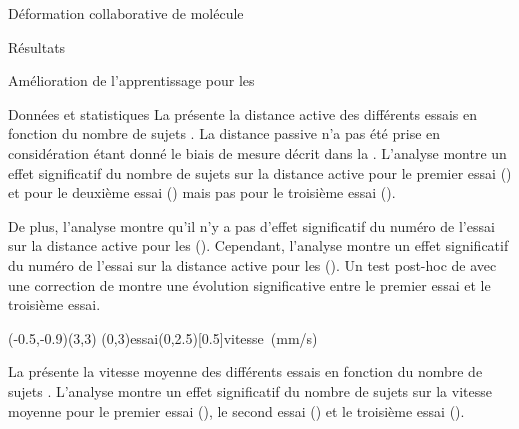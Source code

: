 \documentclass[myfrancais,ngerman,english,frenchb]{mythesis}
\begin{document}
\begin{mychapter}{Déformation collaborative de molécule}
\begin{mysection}{Résultats}
\begin{mysubsection}{Amélioration de l'apprentissage pour les }
\begin{mysubsubsection}{Données et statistiques}
					La  présente la distance active  des différents essais  en fonction du nombre de sujets .
					La distance passive n'a pas été prise en considération étant donné le biais de mesure décrit dans la .
					L'analyse montre un effet significatif du nombre de sujets  sur la distance active  pour le premier essai () et pour le deuxième essai () mais pas pour le troisième essai ().

					De plus, l'analyse montre qu'il n'y a pas d'effet significatif du numéro de l'essai  sur la distance active  pour les  ().
					Cependant, l'analyse montre un effet significatif du numéro de l'essai  sur la distance active  pour les  ().
					Un test post-hoc de  avec une correction de  montre une évolution significative entre le premier essai et le troisième essai.

					\begin{myfigure}
						\begin{myps}(-0.5,-0.9)(3,3)
							\myaxes(0,3){essai}(0,2.5)[0.5]{vitesse~(mm/s)}
						\end{myps}
					\end{myfigure}

					La  présente la vitesse moyenne  des différents essais  en fonction du nombre de sujets .
					L'analyse montre un effet significatif du nombre de sujets  sur la vitesse moyenne  pour le premier essai (), le second essai () et le troisième essai ().


\end{mysubsubsection}
\end{mysubsection}
\end{mysection}
\end{mychapter}
\end{document}
